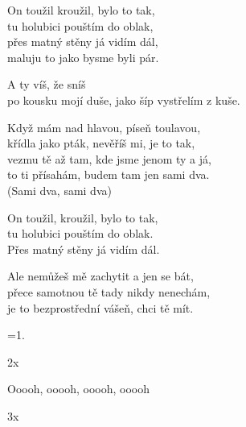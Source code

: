 
\cho{}
On toužil kroužil, bylo to tak,\\
tu holubici pouštím do oblak,\\
přes matný stěny já vidím dál,\\
maluju to jako bysme byli pár.

A ty víš, že sníš\\
po kousku mojí duše, jako šíp vystřelím z kuše.

\ve{}
Když mám nad hlavou, píseň toulavou,\\
křídla jako pták, nevěříš mi, je to tak,\\
vezmu tě až tam, kde jsme jenom ty a já, \\
to ti přísahám, budem tam jen sami dva.\\
(Sami dva, sami dva)

\cho{}

\cho{}
On toužil, kroužil, bylo to tak,\\
tu holubici pouštím do oblak.\\
Přes matný stěny já vidím dál.

Ale nemůžeš mě zachytit a jen se bát, \\
přece samotnou tě tady nikdy nenechám,\\
je to bezprostřední vášeň, chci tě mít.

\ve{}
=1.

\cho{}
2x

\ve{}
Ooooh, ooooh, ooooh, ooooh

\cho{}
3x


\esong